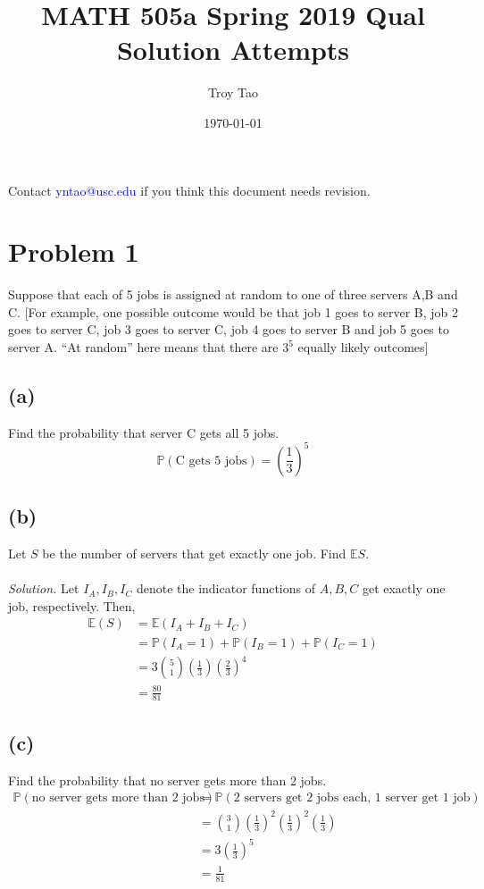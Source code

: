 \documentclass{article}
\title{MATH 505a Spring 2019 Qual Solution Attempts}
\author{Troy Tao}
\date\today
\newcommand{\prob}{\mathbb{P}}
\newcommand{\E}{\mathbb{E}}
\begin{document}
\maketitle 
Contact \textcolor{blue}{yntao@usc.edu} if you think this document needs revision.


\section*{Problem 1}
Suppose that each of 5 jobs is assigned at random to one of three servers A,B and C. [For example, one possible outcome would be that job 1 goes to server B, job 2 goes to server C, job 3 goes to server C, job 4 goes to server B and job 5 goes to server A. ``At random'' here means that there are $3^5$ equally likely outcomes]
\subsection*{(a)}
Find the probability that server C gets all 5 jobs.
\color{blue}
$$\prob(\text{C gets 5 jobs})=\left(\frac{1}{3}\right)^5 $$
\color{black}
\subsection*{(b)}
Let $S$ be the number of servers that get exactly one job. Find $\E S$.
\color{blue}
\\\\\textit{Solution. }
Let $I_A,I_B,I_C$ denote the indicator functions of $A,B,C$ get exactly one job, respectively. Then,
\begin{equation*}
    \begin{split}
        \E(S) &= \E(I_A+I_B+I_C)\\
        &=\prob(I_A=1)+\prob(I_B=1)+\prob(I_C=1)\\
        &= 3{5 \choose 1}\left(\frac{1}{3}\right)\left(\frac{2}{3}\right)^4\\
        &= \frac{80}{81}
    \end{split}
\end{equation*}
\color{black}
\subsection*{(c)}
Find the probability that no server gets more than 2 jobs.
\color{blue}
\begin{equation*}
    \begin{split}
        \prob(\text{no server gets more than 2 jobs}) &= \prob(\text{2 servers get 2 jobs each, 1 server get 1 job})\\
        &= {3 \choose 1} \left(\frac{1}{3}\right)^2\left(\frac{1}{3}\right)^2\left(\frac{1}{3}\right)\\
        &= 3 \left(\frac{1}{3}\right)^5\\
        &= \frac{1}{81}
    \end{split}
\end{equation*}
\color{black}
\end{document}

